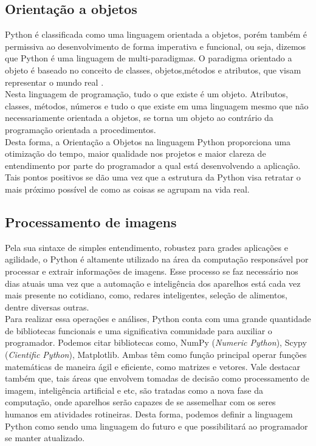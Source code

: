         \subsection{ Orienta\c{c}\~{a}o a objetos}
Python é classificada como uma linguagem orientada a objetos, porém também é permissiva ao desenvolvimento de forma imperativa e funcional, ou seja, dizemos que Python é uma linguagem de multi-paradigmas. O paradigma orientado a objeto é baseado no conceito de classes, objetos,métodos e atributos, que visam representar o mundo real \cite{FBarelli2019}. \\
Nesta linguagem de programação, tudo o que existe é um objeto. Atributos, classes, métodos, números e tudo o que existe em uma linguagem mesmo que não necessariamente orientada a objetos, se torna um objeto ao contrário da programação orientada a procedimentos.\\
Desta forma, a Orientação a Objetos na linguagem Python proporciona uma otimização do tempo, maior qualidade nos projetos e maior clareza de entendimento por parte do programador a qual está desenvolvendo a aplicação. Tais pontos positivos se dão uma vez que a estrutura da Python visa retratar o mais próximo possível de como as coisas se agrupam na vida real.  

        \subsection{Processamento de imagens} 
Pela sua sintaxe de simples entendimento, robustez para grades aplicações e agilidade, o Python é altamente utilizado na área da computação responsável por processar e extrair informações de imagens. Esse processo se faz necessário nos dias atuais uma vez que a automação e inteligência dos aparelhos está cada vez mais presente no cotidiano, como, redares inteligentes, seleção de alimentos, dentre diversas outras.\\
Para realizar essa operações e análises, Python conta com uma grande quantidade de bibliotecas funcionais e uma significativa comunidade para auxiliar o programador. Podemos citar bibliotecas como, NumPy (\textit{Numeric Python}), Scypy (\textit{Cientific Python}), Matplotlib. Ambas têm como função principal operar funções matemáticas de maneira ágil e eficiente, como matrizes e vetores.
Vale destacar também que, tais áreas que envolvem tomadas de decisão como processamento de imagem, inteligência artificial e etc, são tratadas como a nova fase da computação, onde aparelhos serão capazes de se assemelhar com os seres humanos em atividades rotineiras. Desta forma, podemos definir a linguagem Python como sendo uma linguagem do futuro e que possibilitará ao programador se manter atualizado\cite{FBarelli2019}. 